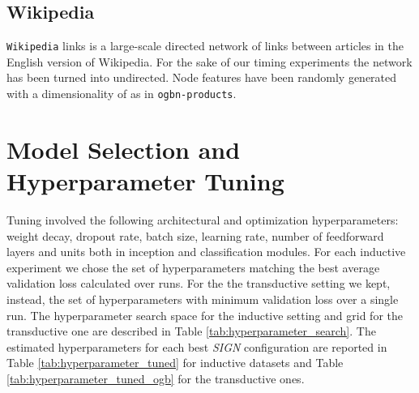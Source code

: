 \documentclass{article}
\begin{document}
\subsection{Wikipedia}

\texttt{Wikipedia} links is a large-scale directed network of links between articles in the English version of Wikipedia. For the sake of our timing experiments the network has been turned into undirected. Node features have been randomly generated with a dimensionality of  as in \texttt{ogbn-products}.

\section{Model Selection and Hyperparameter Tuning}

Tuning involved the following architectural and optimization hyperparameters: weight decay, dropout rate, batch size, learning rate, number of feedforward layers and units both in inception and classification modules. For each inductive experiment we chose the set of hyperparameters matching the best average validation loss calculated over  runs. For the the transductive setting we kept, instead, the set of hyperparameters with minimum validation loss over a single run. The hyperparameter search space for the inductive setting and grid for the transductive one are described in Table \ref{tab:hyperparameter_search}. The estimated hyperparameters for each best \textit{SIGN} configuration are reported in Table \ref{tab:hyperparameter_tuned} for inductive datasets and Table \ref{tab:hyperparameter_tuned_ogb} for the transductive ones.
\end{document}
